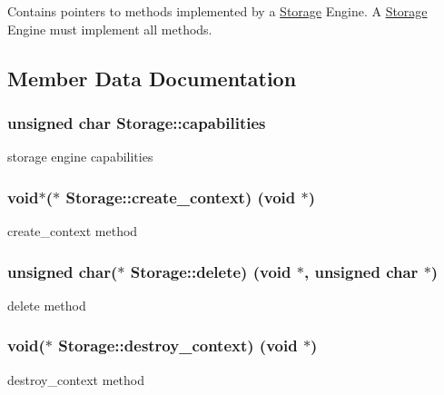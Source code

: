 Contains pointers to methods implemented by a \hyperlink{struct_storage}{Storage} Engine. A \hyperlink{struct_storage}{Storage} Engine must implement all methods. 

\subsection{Member Data Documentation}
\hypertarget{struct_storage_a0317c04d73bd91a5a71311d429d2c463}{}
\subsubsection[{capabilities}]{\setlength{\rightskip}{0pt plus 5cm}unsigned char Storage\+::capabilities}\label{struct_storage_a0317c04d73bd91a5a71311d429d2c463}
storage engine capabilities \hypertarget{struct_storage_a96d6e9b9bfd5b4943eb9660ca2293447}{}
\subsubsection[{create\+\_\+context}]{\setlength{\rightskip}{0pt plus 5cm}void$\ast$($\ast$ Storage\+::create\+\_\+context) (void $\ast$)}\label{struct_storage_a96d6e9b9bfd5b4943eb9660ca2293447}
create\+\_\+context method \hypertarget{struct_storage_ae33c4c6b8e7dda3a854c3754ecbd22d9}{}
\subsubsection[{delete}]{\setlength{\rightskip}{0pt plus 5cm}unsigned char($\ast$ Storage\+::delete) (void $\ast$, unsigned char $\ast$)}\label{struct_storage_ae33c4c6b8e7dda3a854c3754ecbd22d9}
delete method \hypertarget{struct_storage_af425b1971a9fcfed315e6aec547df8da}{}
\subsubsection[{destroy\+\_\+context}]{\setlength{\rightskip}{0pt plus 5cm}void($\ast$ Storage\+::destroy\+\_\+context) (void $\ast$)}\label{struct_storage_af425b1971a9fcfed315e6aec547df8da}
destroy\+\_\+context method \hypertarget{struct_storage_a32909539bbc234d20b4bb0a51c575c9c}{}
